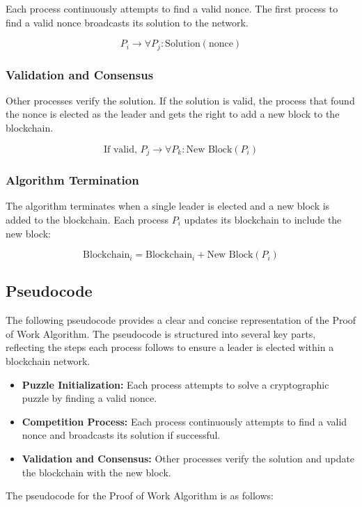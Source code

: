 Each process continuously attempts to find a valid nonce. The first process to find a valid nonce broadcasts its solution to the network.

\begin{equation}
P_i \rightarrow \forall P_j: \text{Solution}(\text{nonce})
\end{equation}

\subsubsection{Validation and Consensus}

Other processes verify the solution. If the solution is valid, the process that found the nonce is elected as the leader and gets the right to add a new block to the blockchain.

\begin{equation}
\text{If valid, } P_j \rightarrow \forall P_k: \text{New Block}(P_i)
\end{equation}

\subsubsection{Algorithm Termination}

The algorithm terminates when a single leader is elected and a new block is added to the blockchain. Each process \(P_i\) updates its blockchain to include the new block:

\begin{equation}
\text{Blockchain}_i = \text{Blockchain}_i + \text{New Block}(P_i)
\end{equation}

\subsection{Pseudocode}

The following pseudocode provides a clear and concise representation of the Proof of Work Algorithm. The pseudocode is structured into several key parts, reflecting the steps each process follows to ensure a leader is elected within a blockchain network.

\begin{itemize}
    \item \textbf{Puzzle Initialization:} Each process attempts to solve a cryptographic puzzle by finding a valid nonce.
    \item \textbf{Competition Process:} Each process continuously attempts to find a valid nonce and broadcasts its solution if successful.
    \item \textbf{Validation and Consensus:} Other processes verify the solution and update the blockchain with the new block.
\end{itemize}
The pseudocode for the Proof of Work Algorithm is as follows:

